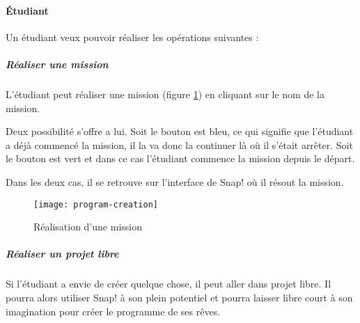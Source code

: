 \paragraph{Étudiant}
Un étudiant veux pouvoir réaliser les opérations suivantes :
\subparagraph{Réaliser une mission} L'étudiant peut réaliser une mission (figure \ref{fig:program-creation}) en cliquant sur le nom de la mission. 

Deux possibilité s'offre a lui. Soit le bouton est bleu, ce qui signifie que l'étudiant a déjà commencé la mission, il la va donc la continuer là où il s'était arrêter. Soit le bouton est vert et dans ce cas l'étudiant commence la mission depuis le départ.

Dans les deux cas, il se retrouve sur l'interface de Snap! où il résout la mission.
\begin{figure}
  \begin{center}
    \texttt{[image: program-creation]}
    \caption{Réalisation d'une mission}
    \label{fig:program-creation}
  \end{center}
\end{figure}

\subparagraph{Réaliser un projet libre} Si l'étudiant a envie de créer quelque chose, il peut aller dans projet libre. Il pourra alors utiliser Snap! à son plein potentiel et pourra laisser libre court à son imagination pour créer le programme de ses rêves.
